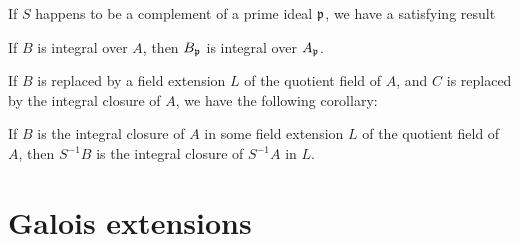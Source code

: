 			If $S$ happens to be a complement of a prime ideal $\mathfrak{p}$, we have a satisfying result
			
			\begin{corollary}
				If $B$ is integral over $A$, then $B_\mathfrak{p}$ is integral over $A_\mathfrak{p}$.
			\end{corollary}
			
			If $B$ is replaced by a field extension $L$ of the quotient field of $A$, and $C$ is replaced by the integral closure of $A$, we have the following corollary:
			
			\begin{corollary}
				If $B$ is the integral closure of $A$ in some field extension $L$ of the quotient field of $A$, then $S^{-1}B$ is the integral closure of $S^{-1}A$ in $L$.
			\end{corollary}
			
	\section{Galois extensions}
